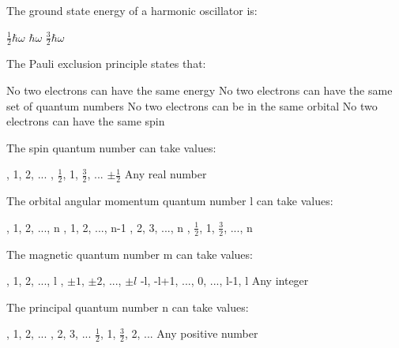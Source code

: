 \begin{question}[2]
The ground state energy of a harmonic oscillator is:

\begin{oneparcheckboxes}
\correctchoice $\frac{1}{2}\hbar\omega$
\choice $\hbar\omega$
\choice $\frac{3}{2}\hbar\omega$
\end{oneparcheckboxes}
\end{question}

\begin{question}[2]
The Pauli exclusion principle states that:

\begin{oneparcheckboxes}
\choice No two electrons can have the same energy
\correctchoice No two electrons can have the same set of quantum numbers
\choice No two electrons can be in the same orbital
\choice No two electrons can have the same spin
\end{oneparcheckboxes}
\end{question}

\begin{question}[2]
The spin quantum number can take values:

\begin{oneparcheckboxes}
, 1, 2, ...
, $\frac{1}{2}$, 1, $\frac{3}{2}$, ...
\correctchoice $\pm\frac{1}{2}$
\choice Any real number
\end{oneparcheckboxes}
\end{question}

\begin{question}[2]
The orbital angular momentum quantum number l can take values:

\begin{oneparcheckboxes}
, 1, 2, ..., n
, 1, 2, ..., n-1
, 2, 3, ..., n
, $\frac{1}{2}$, 1, $\frac{3}{2}$, ..., n
\end{oneparcheckboxes}
\end{question}

\begin{question}[2]
The magnetic quantum number m can take values:

\begin{oneparcheckboxes}
, 1, 2, ..., l
, $\pm1$, $\pm2$, ..., $\pm l$
\correctchoice -l, -l+1, ..., 0, ..., l-1, l
\choice Any integer
\end{oneparcheckboxes}
\end{question}

\begin{question}[2]
The principal quantum number n can take values:

\begin{oneparcheckboxes}
, 1, 2, ...
, 2, 3, ...
\choice $\frac{1}{2}$, 1, $\frac{3}{2}$, 2, ...
\choice Any positive number
\end{oneparcheckboxes}
\end{question} 